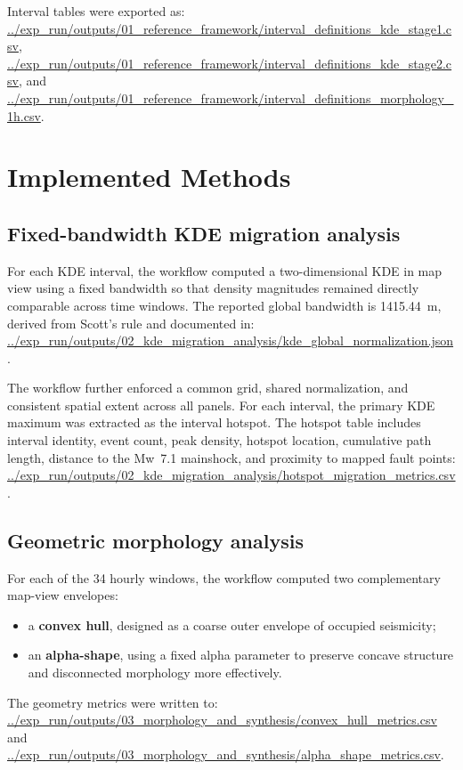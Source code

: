 \documentclass[11pt]{article}
\begin{document}
Interval tables were exported as:
\url{../exp_run/outputs/01_reference_framework/interval_definitions_kde_stage1.csv},
\url{../exp_run/outputs/01_reference_framework/interval_definitions_kde_stage2.csv}, and
\url{../exp_run/outputs/01_reference_framework/interval_definitions_morphology_1h.csv}.

\section{Implemented Methods}
\subsection{Fixed-bandwidth KDE migration analysis}
For each KDE interval, the workflow computed a two-dimensional KDE in map view using a fixed bandwidth so that density magnitudes remained directly comparable across time windows. The reported global bandwidth is 1415.44~m, derived from Scott's rule and documented in:
\url{../exp_run/outputs/02_kde_migration_analysis/kde_global_normalization.json}.

The workflow further enforced a common grid, shared normalization, and consistent spatial extent across all panels. For each interval, the primary KDE maximum was extracted as the interval hotspot. The hotspot table includes interval identity, event count, peak density, hotspot location, cumulative path length, distance to the Mw~7.1 mainshock, and proximity to mapped fault points:
\url{../exp_run/outputs/02_kde_migration_analysis/hotspot_migration_metrics.csv}.

\subsection{Geometric morphology analysis}
For each of the 34 hourly windows, the workflow computed two complementary map-view envelopes:
\begin{itemize}[leftmargin=*]
    \item a \textbf{convex hull}, designed as a coarse outer envelope of occupied seismicity;
    \item an \textbf{alpha-shape}, using a fixed alpha parameter to preserve concave structure and disconnected morphology more effectively.
\end{itemize}

The geometry metrics were written to:
\url{../exp_run/outputs/03_morphology_and_synthesis/convex_hull_metrics.csv} and
\url{../exp_run/outputs/03_morphology_and_synthesis/alpha_shape_metrics.csv}.
\end{document}
